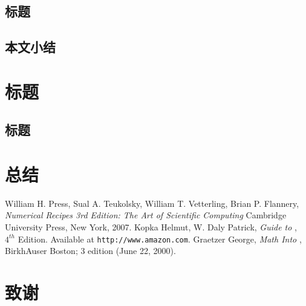 \documentclass[openany,AutoFakeBold]{book}
\theoremstyle{definition}
\begin{document}
\section{标题}






\section{本文小结}



\chapter{标题}
\pagestyle{fancy}

\section{标题}



\chapter{总结}
\pagestyle{fancy}

\backmatter

\begin{thebibliography}{99}
    William H. Press, Sual A. Teukolsky, William T. Vetterling, Brian P. Flannery, \emph{Numerical Recipes 3rd Edition: The Art of Scientific Computing}
    Cambridge University Press, New York, 2007.
    Kopka Helmut, W. Daly Patrick,
    \emph{Guide to \text{\LaTeX}}, $4^{th}$ Edition. Available at \texttt{http://www.amazon.com}.
    Graetzer George, \emph{Math Into \text{\LaTeX}},
    BirkhAuser Boston; 3 edition (June 22, 2000).    
\end{thebibliography}



\chapter{致谢}
\pagestyle{fancy}
\end{document}

